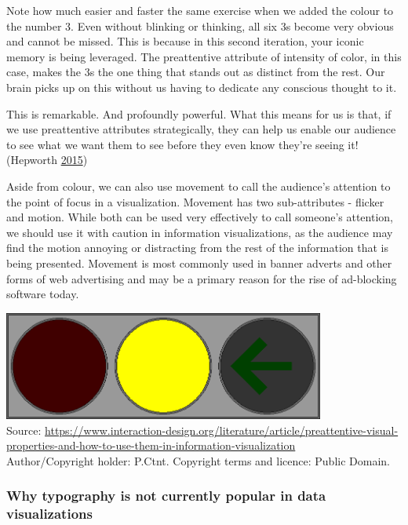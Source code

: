\documentclass[]{book}
\begin{document}
Note how much easier and faster the same exercise when we added the colour to the number 3. Even without blinking or thinking, all six 3s become very obvious and cannot be missed. This is because in this second iteration, your iconic memory is being leveraged. The preattentive attribute of intensity of color, in this case, makes the 3s the one thing that stands out as distinct from the rest. Our brain picks up on this without us having to dedicate any conscious thought to it.

This is remarkable. And profoundly powerful. What this means for us is that, if we use preattentive attributes strategically, they can help us enable our audience to see what we want them to see before they even know they're seeing it! (Hepworth \protect\hyperlink{ref-kathep}{2015})

Aside from colour, we can also use movement to call the audience's attention to the point of focus in a visualization. Movement has two sub-attributes - flicker and motion. While both can be used very effectively to call someone's attention, we should use it with caution in information visualizations, as the audience may find the motion annoying or distracting from the rest of the information that is being presented. Movement is most commonly used in banner adverts and other forms of web advertising and may be a primary reason for the rise of ad-blocking software today.

\includegraphics[width=4.16667in,height=\textheight]{images/preattentive-attr-movement.gif}\\
Source: \url{https://www.interaction-design.org/literature/article/preattentive-visual-properties-and-how-to-use-them-in-information-visualization}\\
Author/Copyright holder: P.Ctnt. Copyright terms and licence: Public Domain.

\hypertarget{why-typography-is-not-currently-popular-in-data-visualizations}{%
\subsubsection{Why typography is not currently popular in data visualizations}\label{why-typography-is-not-currently-popular-in-data-visualizations}}
\end{document}
